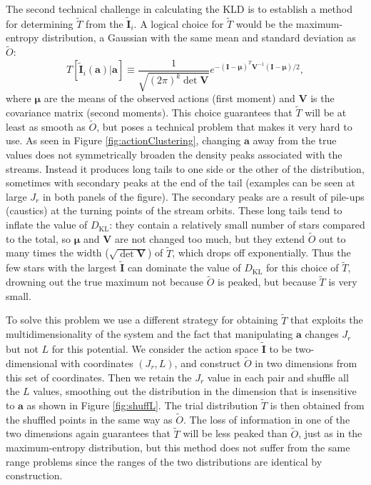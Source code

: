 \documentclass{emulateapj}
\newcommand{\sub}[2]{\ensuremath{#1_{\mathrm{#2}}}}
\begin{document}
The second technical challenge in calculating the KLD is to establish a method for determining $\tilde{T}$ from the $\tilde{\mathbf{I}}_i$. A logical choice for $\tilde{T}$ would be the maximum-entropy distribution, a Gaussian with the same mean and standard deviation as $\tilde{O}$:
\begin{equation}
 T[\tilde{\mathbf{I}}_i(\mathbf{a})|\mathbf{a}] \equiv \frac{1}{\sqrt{(2 \pi)^k \det \mathbf{V}}} e^{-(\mathbf{I}-\mathbf{\mu})^T \mathbf{V}^{-1} (\mathbf{I}-\mathbf{\mu})/2},
\end{equation} 
where $\mathbf{\mu}$ are the means of the observed actions (first moment) and $\mathbf{V}$ is the covariance matrix (second moments). This choice guarantees that $\tilde{T}$ will be at least as smooth as $\tilde{O}$, but poses a technical problem that makes it very hard to use. As seen in Figure \ref{fig:actionClustering}, changing $\mathbf{a}$ away from the true values does not symmetrically broaden the density peaks associated with the streams. Instead it produces long tails to one side or the other of the distribution, sometimes with secondary peaks at the end of the tail (examples can be seen at large $J_r$ in both panels of the figure). The secondary peaks are a result of pile-ups (caustics) at the turning points of the stream orbits. These long tails tend to inflate the value of $\sub{D}{KL}$: they contain a relatively small number of stars compared to the total, so $\mathbf{\mu}$ and $\mathbf{V}$ are not changed too much, but they extend $\tilde{O}$ out to many times the width ($\sqrt{\det \mathbf{V}}$) of $\tilde{T}$, which drops off exponentially. Thus the few stars with the largest $\tilde{\mathbf{I}}$ can dominate the value of $\sub{D}{KL}$ for this choice of $\tilde{T}$, drowning out the true maximum not because $\tilde{O}$ is peaked, but because $\tilde{T}$ is very small.


To solve this problem we use a different strategy for obtaining $\tilde{T}$ that exploits the multidimensionality of the system and the fact that manipulating $\mathbf{a}$ changes $J_r$ but not $L$ for this potential. We consider the action space $\tilde{\mathbf{I}}$ to be two-dimensional with coordinates $(J_r, L)$, and construct $\tilde{O}$ in two dimensions from this set of coordinates. Then we retain the $J_r$ value in each pair and shuffle all the $L$ values, smoothing out the distribution in the dimension that is insensitive to $\mathbf{a}$ as shown in Figure \ref{fig:shuffL}. The trial distribution $\tilde{T}$ is then obtained from the shuffled points in the same way as $\tilde{O}$. The loss of information in one of the two dimensions again guarantees that $\tilde{T}$ will be less peaked than $\tilde{O}$, just as in the maximum-entropy distribution, but this method does not suffer from the same range problems since the ranges of the two distributions are identical by construction.
\end{document}
